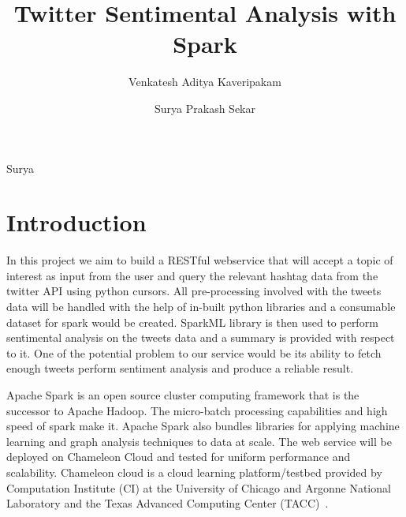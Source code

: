 
\title{Twitter Sentimental Analysis with Spark}


\author{Venkatesh Aditya Kaveripakam}

\author{Surya Prakash Sekar}

\renewcommand{\shortauthors}{Aditya}{Surya}


\begin{abstract}

\end{abstract}



\maketitle

\section{Introduction}
In this project we aim to build a RESTful webservice that will accept a topic
of interest as input from the user and query the relevant hashtag data from
the twitter API using python cursors. All pre-processing involved with the
tweets data will be handled with the help of in-built python libraries and a
consumable dataset for spark would be created. SparkML library is then used
to perform sentimental analysis on the tweets data and a summary is provided
with respect to it. One of the potential problem to our service would be its
ability to fetch enough tweets perform sentiment analysis and produce a
reliable result.

Apache Spark is an open source cluster computing framework that is the
successor to Apache Hadoop. The micro-batch processing capabilities and high
speed of spark make it. Apache Spark also bundles libraries for applying
machine learning and graph analysis techniques to data at scale.
The web service will be deployed on Chameleon Cloud and tested for uniform
performance and scalability. Chameleon cloud is a cloud learning
platform/testbed provided by Computation Institute (CI) at the University of
Chicago and Argonne National Laboratory and the Texas Advanced Computing
Center (TACC)~\cite{hid-sp18-418-chameleon-about}.



 